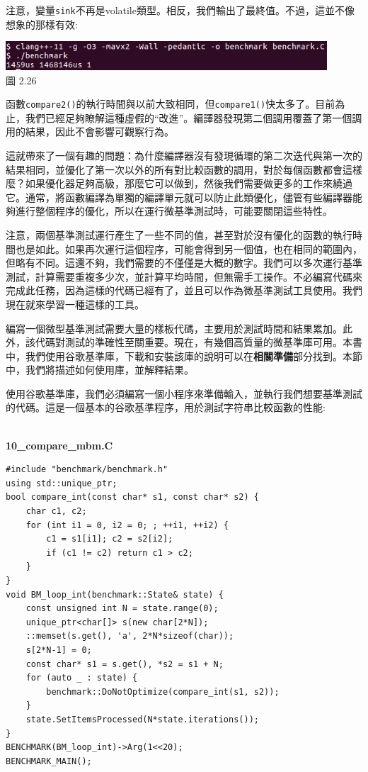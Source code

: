注意，變量\texttt{sink}不再是volatile類型。相反，我們輸出了最終值。不過，這並不像想象的那樣有效:

\begin{center}
\includegraphics[width=0.9\textwidth]{content/1/chapter2/images/26.jpg}\\
圖 2.26
\end{center}

函數\texttt{compare2()}的執行時間與以前大致相同，但\texttt{compare1()}快太多了。目前為止，我們已經足夠瞭解這種虛假的“改進”。編譯器發現第二個調用覆蓋了第一個調用的結果，因此不會影響可觀察行為。

這就帶來了一個有趣的問題：為什麼編譯器沒有發現循環的第二次迭代與第一次的結果相同，並優化了第一次以外的所有對比較函數的調用，對於每個函數都會這樣麼？如果優化器足夠高級，那麼它可以做到，然後我們需要做更多的工作來繞過它。通常，將函數編譯為單獨的編譯單元就可以防止此類優化，儘管有些編譯器能夠進行整個程序的優化，所以在運行微基準測試時，可能要關閉這些特性。

注意，兩個基準測試運行產生了一些不同的值，甚至對於沒有優化的函數的執行時間也是如此。如果再次運行這個程序，可能會得到另一個值，也在相同的範圍內，但略有不同。這還不夠，我們需要的不僅僅是大概的數字。我們可以多次運行基準測試，計算需要重複多少次，並計算平均時間，但無需手工操作。不必編寫代碼來完成此任務，因為這樣的代碼已經有了，並且可以作為微基準測試工具使用。我們現在就來學習一種這樣的工具。


編寫一個微型基準測試需要大量的樣板代碼，主要用於測試時間和結果累加。此外，該代碼對測試的準確性至關重要。現在，有幾個高質量的微基準庫可用。本書中，我們使用谷歌基準庫，下載和安裝該庫的說明可以在\textbf{相關準備}部分找到。本節中，我們將描述如何使用庫，並解釋結果。

使用谷歌基準庫，我們必須編寫一個小程序來準備輸入，並執行我們想要基準測試的代碼。這是一個基本的谷歌基準程序，用於測試字符串比較函數的性能:

\hspace*{\fill} \\ %
\noindent
\textbf{10\_compare\_mbm.C}
\begin{lstlisting}[style=styleCXX]
#include "benchmark/benchmark.h"
using std::unique_ptr;
bool compare_int(const char* s1, const char* s2) {
	char c1, c2;
	for (int i1 = 0, i2 = 0; ; ++i1, ++i2) {
		c1 = s1[i1]; c2 = s2[i2];
		if (c1 != c2) return c1 > c2;
	}
}
void BM_loop_int(benchmark::State& state) {
	const unsigned int N = state.range(0);
	unique_ptr<char[]> s(new char[2*N]);
	::memset(s.get(), 'a', 2*N*sizeof(char));
	s[2*N-1] = 0;
	const char* s1 = s.get(), *s2 = s1 + N;
	for (auto _ : state) {
		benchmark::DoNotOptimize(compare_int(s1, s2));
	}
	state.SetItemsProcessed(N*state.iterations());
}
BENCHMARK(BM_loop_int)->Arg(1<<20);
BENCHMARK_MAIN();
\end{lstlisting}

